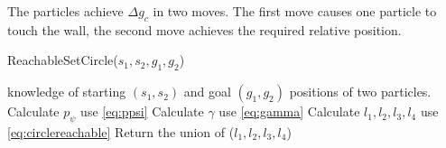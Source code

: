 The particles achieve $\Delta g_c$ in two moves. The first move causes one particle to touch the wall, the second move achieves the required relative position.
 
\begin{algorithm}[htb]
\caption{ { \sc ReachableSetCircle}($s_1,s_2,g_1,g_2$)}\label{alg:circularReachbale}
\begin{algorithmic}[1]
\Require knowledge of starting $(s_1,s_2)$ and goal $(g_1,g_2)$ positions of  two particles. 
\State Calculate $p_{\psi}$ \Comment use \eqref{eq:ppsi}
\State Calculate $\gamma$ \Comment use \eqref{eq:gamma}
\State Calculate $l_1, l_2, l_3, l_4$ \Comment use \eqref{eq:circlereachable} 
\State Return the union of ($l_1, l_2, l_3, l_4$)
\end{algorithmic}
\end{algorithm}
 
% 
 

   

